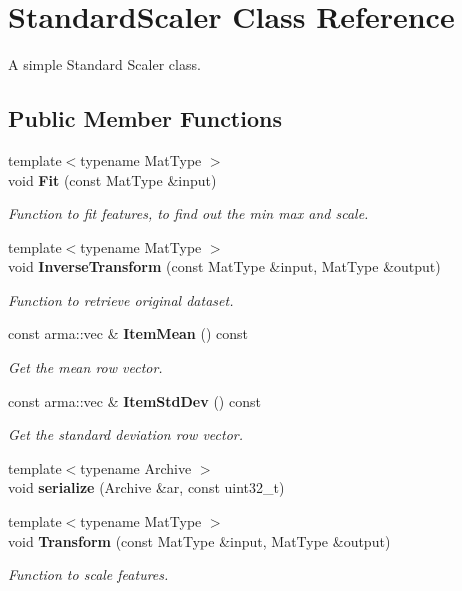 \section{Standard\+Scaler Class Reference}
\label{classmlpack_1_1data_1_1StandardScaler}


A simple Standard Scaler class.  


\subsection*{Public Member Functions}
\begin{DoxyCompactItemize}
\item 
{\footnotesize template$<$typename Mat\+Type $>$ }\\void \textbf{ Fit} (const Mat\+Type \&input)
\begin{DoxyCompactList}\small\item\em Function to fit features, to find out the min max and scale. \end{DoxyCompactList}\item 
{\footnotesize template$<$typename Mat\+Type $>$ }\\void \textbf{ Inverse\+Transform} (const Mat\+Type \&input, Mat\+Type \&output)
\begin{DoxyCompactList}\small\item\em Function to retrieve original dataset. \end{DoxyCompactList}\item 
const arma\+::vec \& \textbf{ Item\+Mean} () const
\begin{DoxyCompactList}\small\item\em Get the mean row vector. \end{DoxyCompactList}\item 
const arma\+::vec \& \textbf{ Item\+Std\+Dev} () const
\begin{DoxyCompactList}\small\item\em Get the standard deviation row vector. \end{DoxyCompactList}\item 
{\footnotesize template$<$typename Archive $>$ }\\void \textbf{ serialize} (Archive \&ar, const uint32\+\_\+t)
\item 
{\footnotesize template$<$typename Mat\+Type $>$ }\\void \textbf{ Transform} (const Mat\+Type \&input, Mat\+Type \&output)
\begin{DoxyCompactList}\small\item\em Function to scale features. \end{DoxyCompactList}\end{DoxyCompactItemize}


